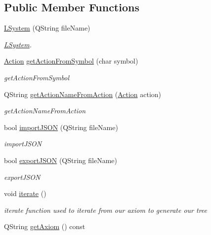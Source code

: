 \subsection*{Public Member Functions}
\begin{DoxyCompactItemize}
\item 
\hyperlink{classLSystem_ab867b4862befaaf5032f9d5d7c54d958}{L\+System} (Q\+String file\+Name)
\begin{DoxyCompactList}\small\item\em \hyperlink{classLSystem}{L\+System}. \end{DoxyCompactList}\item 
\hyperlink{classLSystem_a51a104d178453025feb01bd5c81298c7}{Action} \hyperlink{classLSystem_a9ded49237eb7e5b87ce0a40c05ddd8dc}{get\+Action\+From\+Symbol} (char symbol)
\begin{DoxyCompactList}\small\item\em get\+Action\+From\+Symbol \end{DoxyCompactList}\item 
Q\+String \hyperlink{classLSystem_a9e7629465147d4959c15bf678bff1325}{get\+Action\+Name\+From\+Action} (\hyperlink{classLSystem_a51a104d178453025feb01bd5c81298c7}{Action} action)
\begin{DoxyCompactList}\small\item\em get\+Action\+Name\+From\+Action \end{DoxyCompactList}\item 
bool \hyperlink{classLSystem_ab7987f060d378683ea3a5aadbf652fb8}{import\+J\+S\+ON} (Q\+String file\+Name)
\begin{DoxyCompactList}\small\item\em import\+J\+S\+ON \end{DoxyCompactList}\item 
bool \hyperlink{classLSystem_a6bd4eca47384206c7d54d8971add7766}{export\+J\+S\+ON} (Q\+String file\+Name)
\begin{DoxyCompactList}\small\item\em export\+J\+S\+ON \end{DoxyCompactList}\item 
void \hyperlink{classLSystem_a75600a935cbd5bbdcb27168489657f48}{iterate} ()
\begin{DoxyCompactList}\small\item\em iterate function used to iterate from our axiom to generate our tree \end{DoxyCompactList}\item 
Q\+String \hyperlink{classLSystem_aa5ac6cf5036d466402a6cb8eb7151abe}{get\+Axiom} () const

\end{DoxyCompactItemize}
